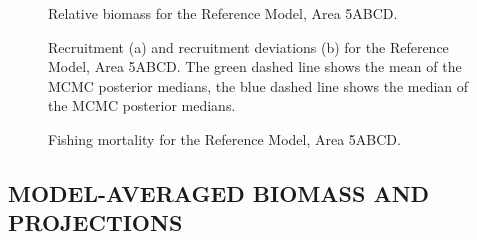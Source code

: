 \documentclass[11pt]{book}
\begin{document}
\begin{figure}[htb]

{\centering {} 

}

\caption{Relative biomass for the Reference Model, Area 5ABCD.}\label{fig:fig-base-depl-5abcd}
\end{figure}
\begin{figure}[htb]

{\centering {} 

}

\caption{Recruitment (a) and recruitment deviations (b) for the Reference Model, Area 5ABCD.  The green dashed line shows the mean of the MCMC posterior medians, the blue dashed line shows the median of the MCMC posterior medians.}\label{fig:fig-base-recr-5abcd}
\end{figure}
\begin{figure}[htb]

{\centering {} 

}

\caption{Fishing mortality for the Reference Model, Area 5ABCD.}\label{fig:fig-base-f-5abcd}
\end{figure}
\clearpage

\hypertarget{sec:projections}{%
\subsection{MODEL-AVERAGED BIOMASS AND PROJECTIONS}\label{sec:projections}}
\end{document}
